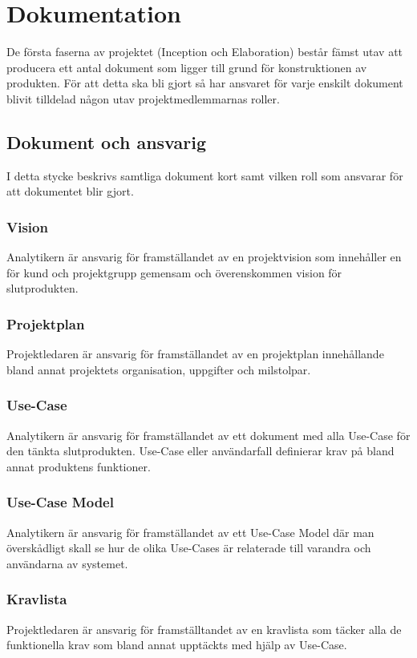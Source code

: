\section{Dokumentation}
De första faserna av projektet (Inception och Elaboration) består fämst utav att producera ett antal dokument som ligger till grund för konstruktionen av produkten. För att detta ska bli gjort så har ansvaret för varje enskilt dokument blivit tilldelad någon utav projektmedlemmarnas roller.
\subsection{Dokument och ansvarig}
I detta stycke beskrivs samtliga dokument kort samt vilken roll som ansvarar för att dokumentet blir gjort.

\subsubsection{Vision}
Analytikern är ansvarig för framställandet av en projektvision som innehåller en för kund och projektgrupp gemensam och överenskommen vision för slutprodukten.

\subsubsection{Projektplan}
Projektledaren är ansvarig för framställandet av en projektplan innehållande bland annat projektets organisation, uppgifter och milstolpar.

\subsubsection{Use-Case}
Analytikern är ansvarig för framställandet av ett dokument med alla Use-Case för den tänkta slutprodukten. Use-Case eller användarfall definierar krav på bland annat produktens funktioner.

\subsubsection{Use-Case Model}
Analytikern är ansvarig för framställandet av ett Use-Case Model där man överskådligt skall se hur de olika Use-Cases är relaterade till varandra och användarna av systemet.

\subsubsection{Kravlista}
Projektledaren är ansvarig för framställtandet av en kravlista som täcker alla de funktionella krav som bland annat upptäckts med hjälp av Use-Case.

